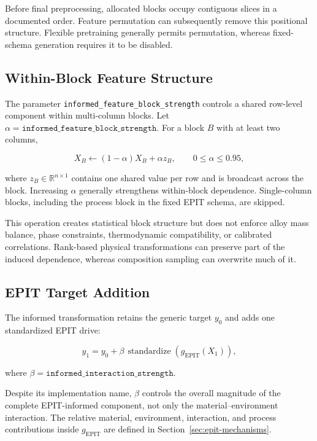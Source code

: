 \documentclass{article}
\begin{document}
Before final preprocessing, allocated blocks occupy contiguous slices in a documented order. Feature permutation can subsequently remove this positional structure. Flexible pretraining generally permits permutation, whereas fixed-schema generation requires it to be disabled.

\subsection{Within-Block Feature Structure}

The parameter \texttt{informed\_feature\_block\_strength} controls a shared row-level component within multi-column blocks. Let \(\alpha=\texttt{informed\_feature\_block\_strength}\). For a block \(B\) with at least two columns,

\begin{equation}
X_B\leftarrow(1-\alpha)X_B+\alpha z_B,
\qquad 0\leq\alpha\leq0.95,
\label{eq:block-coupling}
\end{equation}

where \(z_B\in\mathbb{R}^{n\times1}\) contains one shared value per row and is broadcast across the block. Increasing \(\alpha\) generally strengthens within-block dependence. Single-column blocks, including the process block in the fixed EPIT schema, are skipped.

This operation creates statistical block structure but does not enforce alloy mass balance, phase constraints, thermodynamic compatibility, or calibrated correlations. Rank-based physical transformations can preserve part of the induced dependence, whereas composition sampling can overwrite much of it.

\subsection{EPIT Target Addition}

The informed transformation retains the generic target \(y_0\) and adds one standardized EPIT drive:

\begin{equation}
y_1
=
y_0
+
\beta\,
\operatorname{standardize}
\left(g_{\mathrm{EPIT}}(X_1)\right),
\label{eq:epit-target-addition}
\end{equation}

where \(\beta=\texttt{informed\_interaction\_strength}\).

Despite its implementation name, \(\beta\) controls the overall magnitude of the complete EPIT-informed component, not only the material--environment interaction. The relative material, environment, interaction, and process contributions inside \(g_{\mathrm{EPIT}}\) are defined in Section~\ref{sec:epit-mechanisms}.
\end{document}
